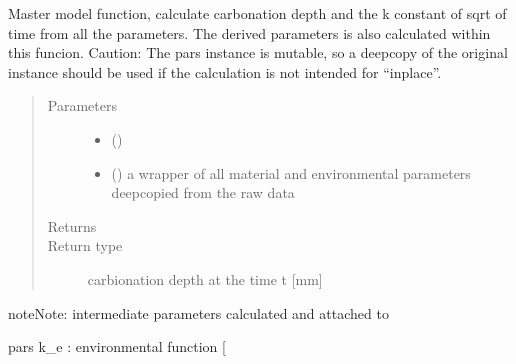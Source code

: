 \documentclass[letterpaper,10pt,english]{sphinxmanual}
\begin{document}
\begin{fulllineitems}
\label{\detokenize{carbonation:carbonation.Carb_depth}}
\sphinxAtStartPar
Master model function, calculate carbonation depth and the k constant of sqrt of time from all the
parameters. The derived parameters is also calculated within this funcion. Caution: The pars instance is mutable,
so a deepcopy of the original instance should be used if the calculation is not intended for “inplace”.
\begin{quote}\begin{description}
\item[{Parameters}] \leavevmode\begin{itemize}
\item {} 
\sphinxAtStartPar
{} (\sphinxstyleliteralemphasis{\sphinxupquote{ {[}}}\sphinxstyleliteralemphasis{\sphinxupquote{{]}}}) \textendash{} 

\item {} 
\sphinxAtStartPar
{} (\sphinxstyleliteralemphasis{\sphinxupquote{(}}\sphinxstyleliteralemphasis{\sphinxupquote{)}}) \textendash{} a wrapper of all material and environmental parameters deep\sphinxhyphen{}copied from the raw data

\end{itemize}

\item[{Returns}] \leavevmode
\sphinxAtStartPar
{}

\item[{Return type}] \leavevmode
\sphinxAtStartPar
carbionation depth at the time t {[}mm{]}

\end{description}\end{quote}

\begin{sphinxadmonition}{note}{Note:}
\sphinxAtStartPar
intermediate parameters calculated and attached to

\sphinxAtStartPar
pars k\_e : environmental function {[}\sphinxhyphen{}{]}


\end{sphinxadmonition}
\end{fulllineitems}
\end{document}
